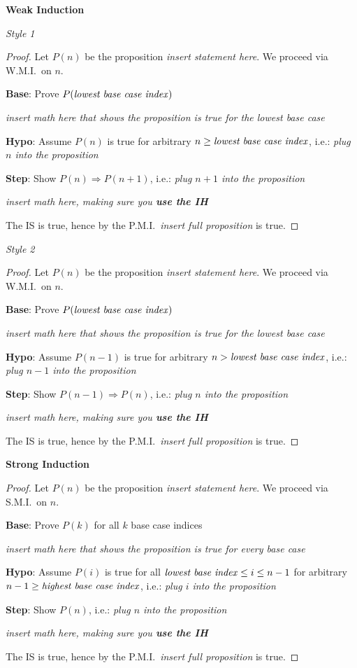 \documentclass[main.tex]{subfiles}
\begin{document}
\textbf{Weak Induction}

\textit{Style 1}
\begin{proof}
	Let \(P(n)\) be the proposition \textit{insert statement here}. We proceed via W.M.I.\ on \(n\).
	
	\textbf{Base}: Prove \(P(\text{\textit{lowest base case index}})\)
	
	\textit{insert math here that shows the proposition is true for the lowest base case}
	
	\textbf{Hypo}: Assume \(P(n)\) is true for arbitrary \(n \geq \text{\textit{lowest base case index}}\), i.e.: \textit{plug \(n\) into the proposition}
	
	\textbf{Step}: Show \(P(n) \Rightarrow P(n+1)\), i.e.: \textit{plug \(n+1\) into the proposition}
	
	\textit{insert math here, making sure you \textbf{use the IH}}
	
	The IS is true, hence by the P.M.I.\ \textit{insert full proposition} is true.
\end{proof}

\textit{Style 2}
\begin{proof}
	Let \(P(n)\) be the proposition \textit{insert statement here}. We proceed via W.M.I.\ on \(n\).
	
	\textbf{Base}: Prove \(P(\text{\textit{lowest base case index}})\)
	
	\textit{insert math here that shows the proposition is true for the lowest base case}
	
	\textbf{Hypo}: Assume \(P(n-1)\) is true for arbitrary \(n > \text{\textit{lowest base case index}}\), i.e.: \textit{plug \(n-1\) into the proposition}
	
	\textbf{Step}: Show \(P(n-1) \Rightarrow P(n)\), i.e.: \textit{plug \(n\) into the proposition}
	
	\textit{insert math here, making sure you \textbf{use the IH}}
	
	The IS is true, hence by the P.M.I.\ \textit{insert full proposition} is true.
\end{proof}

\textbf{Strong Induction}

\begin{proof}
	Let \(P(n)\) be the proposition \textit{insert statement here}. We proceed via S.M.I.\ on \(n\).
	
	\textbf{Base}: Prove \(P(k)\) for all \(k\) base case indices
	
	\textit{insert math here that shows the proposition is true for every base case}
	
	\textbf{Hypo}: Assume \(P(i)\) is true for all \(\text{\textit{lowest base index}} \leq i \leq n-1\) for arbitrary \(n-1 \geq \text{\textit{highest base case index}}\), i.e.: \textit{plug \(i\) into the proposition}
	
	\textbf{Step}: Show \(P(n)\), i.e.: \textit{plug \(n\) into the proposition}
	
	\textit{insert math here, making sure you \textbf{use the IH}}
	
	The IS is true, hence by the P.M.I.\ \textit{insert full proposition} is true.
\end{proof}
\end{document}
